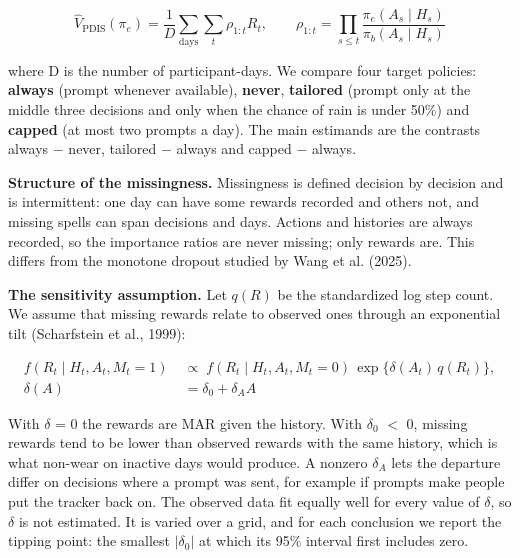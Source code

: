 \documentclass[12pt]{article}
\begin{document}
\begin{equation}\label{eq:pdis}
\hat V_{\mathrm{PDIS}}(\pi_e)=\frac{1}{D}\sum_{\text{days}}\sum_{t}\rho_{1:t}R_t,\qquad \rho_{1:t}=\prod_{s\le t}\frac{\pi_e(A_s\mid H_s)}{\pi_b(A_s\mid H_s)}
\end{equation}

where D is the number of participant-days. We compare four target policies: \textbf{always} (prompt whenever available), \textbf{never}, \textbf{tailored} (prompt only at the middle three decisions and only when the chance of rain is under 50\%) and \textbf{capped} (at most two prompts a day). The main estimands are the contrasts always $-$ never, tailored $-$ always and capped $-$ always.

\textbf{Structure of the missingness.} Missingness is defined decision by decision and is intermittent: one day can have some rewards recorded and others not, and missing spells can span decisions and days. Actions and histories are always recorded, so the importance ratios are never missing; only rewards are. This differs from the monotone dropout studied by Wang et al. (2025).

\textbf{The sensitivity assumption.} Let $q(R)$ be the standardized log step count. We assume that missing rewards relate to observed ones through an exponential tilt (Scharfstein et al., 1999):

\begin{equation}\label{eq:tilt}
\begin{split} f(R_t\mid H_t,A_t,M_t=1)\;&\propto\; f(R_t\mid H_t,A_t,M_t=0)\,\exp\{\delta(A_t)\,q(R_t)\},\\ \delta(A)&=\delta_0+\delta_A A \end{split}
\end{equation}

With $\delta$ = 0 the rewards are MAR given the history. With $\delta_0$ $<$ 0, missing rewards tend to be lower than observed rewards with the same history, which is what non-wear on inactive days would produce. A nonzero $\delta_A$ lets the departure differ on decisions where a prompt was sent, for example if prompts make people put the tracker back on. The observed data fit equally well for every value of $\delta$, so $\delta$ is not estimated. It is varied over a grid, and for each conclusion we report the tipping point: the smallest $|\delta_0|$ at which its 95\% interval first includes zero.
\end{document}
